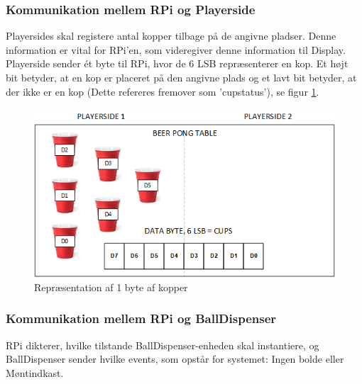\documentclass[Rapport/Rapport_main.tex]{subfiles}
\begin{document}
\subsubsection{Kommunikation mellem RPi og Playerside}
Playersides skal registere antal kopper tilbage på de angivne pladser. Denne information er vital for RPi’en, som videregiver denne information til Display. Playerside sender ét byte til RPi, hvor de 6 LSB repræsenterer en kop. Et højt bit betyder, at en kop er placeret på den angivne plads og et lavt bit betyder, at der ikke er en kop (Dette refereres fremover som 'cupstatus'), se figur \ref{fig:cups_setup}.
\begin{figure}[H]
    \centering
    \includegraphics[width=\textwidth]{Arkitektur/Grenseflader/Graphics/cups.png}
    \caption{Repræsentation af 1 byte af kopper}
    \label{fig:cups_setup}
\end{figure}
\subsubsection{Kommunikation mellem RPi og BallDispenser}
RPi dikterer, hvilke tilstande BallDispenser-enheden skal instantiere, og BallDispenser sender hvilke events, som opstår for systemet: Ingen bolde eller Møntindkast.
\end{document}
